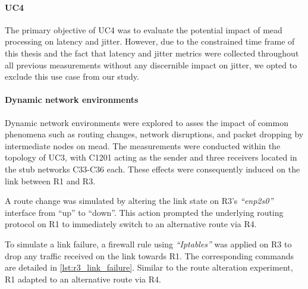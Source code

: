 \paragraph{UC4} %
\label{par:UC4}
The primary objective of UC4 was to evaluate the potential impact of \gls{mead}
    processing on latency and jitter.
However, due to the constrained time frame of this thesis and the fact that 
    latency and jitter metrics were collected throughout all previous
    measurements without any discernible impact on jitter, we opted to exclude
    this use case from our study.

\paragraph{Dynamic network environments} %
\label{par:Dynamic network environments}
Dynamic network environments were explored to asses the impact of common
    phenomena such as routing changes, network disruptions, and packet dropping
    by intermediate nodes on \gls{mead}.
The measurements were conducted within the topology of UC3, with C1201 acting
    as the sender and three receivers located in the stub networks C33-C36
    each.
These effects were consequently induced on the link between R1 and R3.

A route change was simulated by altering the link state on R3's
    \textit{``enp2s0''} interface from ``up'' to ``down''.
This action prompted the underlying routing protocol on R1 to immediately
    switch to an alternative route via R4.

To simulate a link failure, a firewall rule using \textit{``Iptables''} was
    applied on R3 to drop any traffic received on the link towards R1.
The corresponding commands are detailed in \autoref{lst:r3_link_failure}.
Similar to the route alteration experiment, R1 adapted to an alternative route
    via R4.

